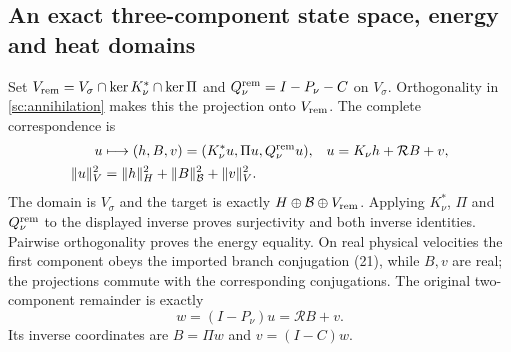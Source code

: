 \subsection*{An exact three-component state space, energy and heat domains}

Set
$V_{\rm rem}=V_\sigma\cap\ker K_\nu^*\cap\ker\Pi$ and
$Q_\nu^{\rm rem}=I-P_\nu-C$ on $V_\sigma$. Orthogonality in
\eqref{sc:annihilation} makes this the projection onto $V_{\rm rem}$.
The complete correspondence is
\begin{align}
 u&\longmapsto(h,B,v)=(K_\nu^*u,\Pi u,Q_\nu^{\rm rem}u),
 &u&=K_\nu h+\mathcal RB+v,\label{sc:triple}\\
 \|u\|_V^2&=\|h\|_H^2+\|B\|_{\mathcal B}^2+\|v\|_V^2.
 \label{sc:energy}
\end{align}
The domain is $V_\sigma$ and the target is exactly
$H\oplus\mathcal B\oplus V_{\rm rem}$. Applying $K_\nu^*$,
$\Pi$ and $Q_\nu^{\rm rem}$ to the displayed inverse proves
surjectivity and both inverse identities. Pairwise orthogonality
proves the energy equality. On real physical velocities the first
component obeys the imported branch conjugation (21), while $B,v$
are real; the projections commute with the corresponding conjugations.
The original two-component remainder is exactly
\begin{equation}
 w=(I-P_\nu)u=\mathcal RB+v.
 \label{sc:oldremainder}
\end{equation}
Its inverse coordinates are $B=\Pi w$ and $v=(I-C)w$.


